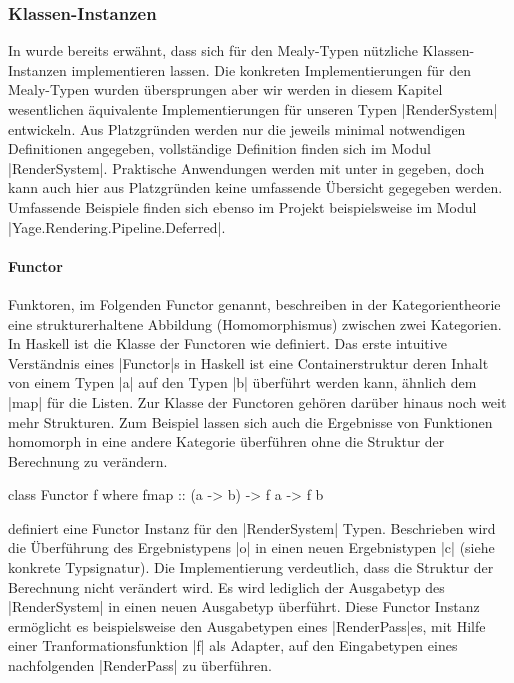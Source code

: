 \subsubsection{Klassen-Instanzen}
\label{sec:rendersystem-klassen-instanzen}

In  wurde bereits erwähnt, dass sich für den Mealy-Typen nützliche Klassen-Instanzen implementieren lassen. Die konkreten Implementierungen für den Mealy-Typen wurden übersprungen aber wir werden in diesem Kapitel wesentlichen äquivalente Implementierungen für unseren Typen |RenderSystem| entwickeln. Aus Platzgründen werden nur die jeweils minimal notwendigen Definitionen angegeben, vollständige Definition finden sich im Modul |RenderSystem|. Praktische Anwendungen werden mit unter in  gegeben, doch kann auch hier aus Platzgründen keine umfassende Übersicht gegegeben werden. Umfassende Beispiele finden sich ebenso im Projekt beispielsweise im Modul |Yage.Rendering.Pipeline.Deferred|.

\paragraph{Functor} 
Funktoren, im Folgenden Functor genannt, beschreiben in der Kategorientheorie eine strukturerhaltene Abbildung (Homomorphismus) zwischen zwei Kategorien. In Haskell ist die Klasse der Functoren wie  definiert. Das erste intuitive Verständnis eines |Functor|s in Haskell ist eine Containerstruktur deren Inhalt von einem Typen |a| auf den Typen |b| überführt werden kann, ähnlich dem |map| für die Listen. Zur Klasse der Functoren gehören darüber hinaus noch weit mehr Strukturen. Zum Beispiel lassen sich auch die Ergebnisse von Funktionen homomorph in eine andere Kategorie überführen ohne die Struktur der Berechnung zu verändern.

\begin{haskell}[label={lst:class-functor},caption={Functor Klasse},nolol]
class Functor f where
  fmap :: (a -> b) -> f a -> f b 
\end{haskell}

 definiert eine Functor Instanz für den |RenderSystem| Typen. Beschrieben wird die Überführung des Ergebnistypens |o| in einen neuen Ergebnistypen |c| (siehe konkrete Typsignatur). Die Implementierung verdeutlich, dass die Struktur der Berechnung nicht verändert wird. Es wird lediglich der Ausgabetyp des |RenderSystem| in einen neuen Ausgabetyp überführt. Diese Functor Instanz ermöglicht es beispielsweise den Ausgabetypen eines |RenderPass|es, mit Hilfe einer Tranformationsfunktion |f| als Adapter, auf den Eingabetypen eines nachfolgenden |RenderPass| zu überführen.


